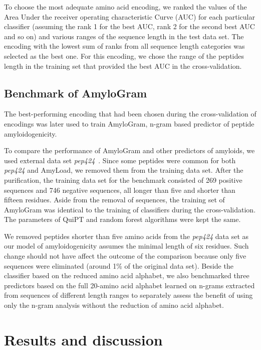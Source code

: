 \documentclass[fleqn,10pt,twoside]{gcb15submission}
\begin{document}
  To choose the most adequate amino acid encoding, we ranked the values of the 
Area Under the receiver operating characteristic Curve (AUC) for each particular 
classifier (assuming the rank 1 for the best AUC, rank 2 for the second best AUC 
and so on) and various ranges of the sequence length in the test data set. The 
encoding with the lowest sum of ranks from all sequence length categories was 
selected as the best one. For this encoding, we chose the range of the peptides 
length in the training set that provided the best AUC in the cross-validation. 

\subsection{Benchmark of AmyloGram}

The best-performing encoding that had been chosen during the cross-validation of 
encodings was later used to train AmyloGram, n-gram based predictor of peptide 
amyloidogenicity.

  To compare the performance of AmyloGram and other predictors of amyloids, we 
used external data set \textit{pep424}~\citep{walsh_pasta_2014}. Since some 
peptides were common for both \textit{pep424} and AmyLoad, we removed them from 
the training data set. After the purification, the training data set for 
the benchmark consisted of 269 positive sequences and 746 negative 
sequences, all longer than five and shorter than fifteen residues. Aside from the 
removal of sequences, the training set of AmyloGram was identical to the training of
classifiers during the cross-validation. The parameters of QuiPT and random forest 
algorithms were kept the same. 

  We removed peptides shorter than five amino acids from the \textit{pep424} 
data set as our model of amyloidogenicity assumes the minimal length of six 
residues. Such change should not have affect the outcome of the comparison because 
only five sequences were eliminated (around 1\% of the original data set). 
Beside the classifier based on the reduced amino acid alphabet, we also 
benchmarked three predictors based on the full 20-amino acid alphabet learned on 
n-grams extracted from sequences of different length ranges to separately 
assess the benefit of using only the n-gram analysis without the reduction of 
amino acid alphabet.

\section{Results and discussion}
\end{document}
